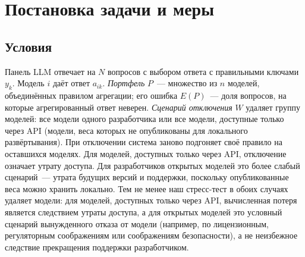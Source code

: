 \documentclass[preprint,12pt,authoryear]{elsarticle}
\begin{document}
\section{Постановка задачи и меры}

\subsection{Условия}
Панель LLM отвечает на $N$ вопросов с выбором ответа с правильными ключами $y_k$. Модель $i$ даёт ответ $a_{ik}$. \emph{Портфель} $P$~--- множество из $n$ моделей, объединённых правилом агрегации; его ошибка $E(P)$~--- доля вопросов, на которые агрегированный ответ неверен. \emph{Сценарий отключения} $W$ удаляет группу моделей: все модели одного разработчика или все модели, доступные только через API (модели, веса которых не опубликованы для локального развёртывания). При отключении система заново подгоняет своё правило на оставшихся моделях. Для моделей, доступных только через API, отключение означает утрату доступа. Для разработчиков открытых моделей это более слабый сценарий~--- утрата будущих версий и поддержки, поскольку опубликованные веса можно хранить локально. Тем не менее наш стресс-тест в обоих случаях удаляет модели: для моделей, доступных только через API, вычисленная потеря является следствием утраты доступа, а для открытых моделей это условный сценарий вынужденного отказа от модели (например, по лицензионным, регуляторным соображениям или соображениям безопасности), а не неизбежное следствие прекращения поддержки разработчиком.
\end{document}
